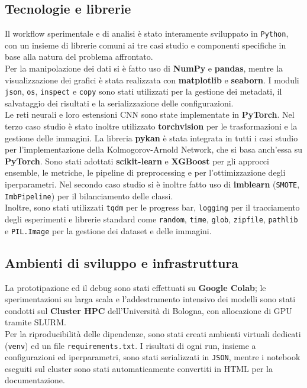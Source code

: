 \documentclass[a4paper,12pt]{report}
\begin{document}
	\subsection{Tecnologie e librerie}
	Il workflow sperimentale e di analisi è stato interamente sviluppato in \texttt{Python}, con un insieme di librerie comuni ai tre casi studio e componenti specifiche in base alla natura del problema affrontato. \\
	Per la manipolazione dei dati si è fatto uso di \textbf{NumPy} e \textbf{pandas}, mentre la visualizzazione dei grafici è stata realizzata con \textbf{matplotlib} e \textbf{seaborn}. I moduli \texttt{json}, \texttt{os}, \texttt{inspect} e \texttt{copy} sono stati utilizzati per la gestione dei metadati, il salvataggio dei risultati e la serializzazione delle configurazioni. \\
	Le reti neurali e loro estensioni CNN sono state implementate in \textbf{PyTorch}. Nel terzo caso studio è stato inoltre utilizzato \textbf{torchvision} per le trasformazioni e la gestione delle immagini. La libreria \textbf{pykan} è stata integrata in tutti i casi studio per l’implementazione della Kolmogorov-Arnold Network, che si basa anch'essa su \textbf{PyTorch}.
	Sono stati adottati \textbf{scikit-learn} e \textbf{XGBoost} per gli approcci ensemble, le metriche, le pipeline di preprocessing e per l'ottimizzazione degli iperparametri. Nel secondo caso studio si è inoltre fatto uso di \textbf{imblearn} (\texttt{SMOTE}, \texttt{ImbPipeline}) per il bilanciamento delle classi. \\
	Inoltre, sono stati utilizzati \texttt{tqdm} per le progress bar, \texttt{logging} per il tracciamento degli esperimenti e librerie standard come \texttt{random}, \texttt{time}, \texttt{glob}, \texttt{zipfile}, \texttt{pathlib} e \texttt{PIL.Image} per la gestione dei dataset e delle immagini.
	
	\subsection{Ambienti di sviluppo e infrastruttura}
	La prototipazione ed il debug sono stati effettuati su \textbf{Google Colab}; le sperimentazioni su larga scala e l’addestramento intensivo dei modelli sono stati condotti sul \textbf{Cluster HPC} dell’Università di Bologna, con allocazione di GPU tramite SLURM. \\
	Per la riproducibilità delle dipendenze, sono stati creati ambienti virtuali dedicati (\texttt{venv}) ed un file \texttt{requirements.txt}. I risultati di ogni run, insieme a configurazioni ed iperparametri, sono stati serializzati in \texttt{JSON}, mentre i notebook eseguiti sul cluster sono stati automaticamente convertiti in HTML per la documentazione.
	
\end{document}
